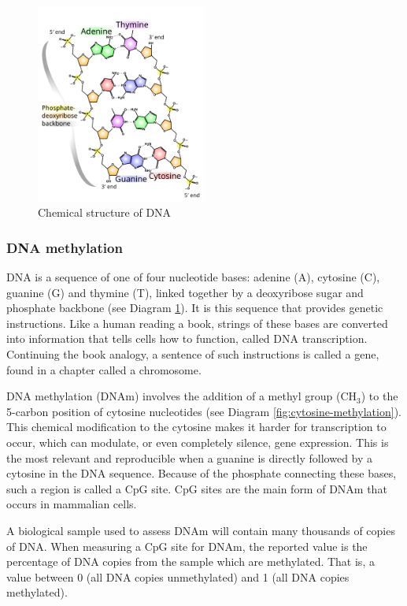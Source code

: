 \documentclass[draft]{article} %
\begin{document}
\begin{figure}
    \centering
    \includegraphics[width=0.5\textwidth]{512px-DNA_chemical_structure.svg.png}
    \caption[Chemical structure of DNA]{Chemical structure of DNA \cite{ball_DNA_structure}}
    \label{fig:dna-structure}
\end{figure}

\subsubsection{DNA methylation}
DNA is a sequence of one of four nucleotide bases: adenine (A), cytosine (C), guanine (G) and thymine (T), linked together by a deoxyribose sugar and phosphate backbone (see Diagram \ref{fig:dna-structure}). It is this sequence that provides genetic instructions. Like a human reading a book, strings of these bases are converted into information that tells cells how to function, called DNA transcription. Continuing the book analogy, a sentence of such instructions is called a gene, found in a chapter called a chromosome.

DNA methylation (DNAm) involves the addition of a methyl group (CH\(_3\)) to the 5-carbon position of cytosine nucleotides (see Diagram \ref{fig:cytosine-methylation}). This chemical modification to the cytosine makes it harder for transcription to occur, which can modulate, or even completely silence, gene expression. This is the most relevant and reproducible when a guanine is directly followed by a cytosine in the DNA sequence. Because of the phosphate connecting these bases, such a region is called a CpG site. CpG sites are the main form of DNAm that occurs in mammalian cells.

A biological sample used to assess DNAm will contain many thousands of copies of DNA. When measuring a CpG site for DNAm, the reported value is the percentage of DNA copies from the sample which are methylated. That is, a value between 0 (all DNA copies unmethylated) and 1 (all DNA copies methylated).
\end{document}
